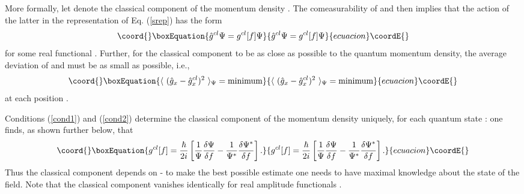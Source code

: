 \documentclass[a4paper,preprint, showpacs, aps, draft]{revtex4}
\begin{document}
{More formally, let \coordHE{} denote the classical component of the
momentum density \coordHE{}.  The comeasurability of \coordHE{} and
\coordHE{} then implies that the action of the latter in the
representation of Eq. (\ref{srep}) has the form
\begin{equation}\coord{}\boxEquation{ \label{cond1}
\hat{g}^{cl} \Psi = g^{cl}[f]\Psi
}{ \hat{g}^{cl} \Psi = g^{cl}[f]\Psi
}{ecuacion}\coordE{}\end{equation}
for some real functional \coordHE{}.   
Further, for the classical component to be as close as possible
to the quantum momentum density, the average
deviation of \coordHE{} and \coordHE{} must be as small as possible,
i.e., 
\begin{equation}\coord{}\boxEquation{ \label{cond2}
\langle ~(\hat{g}_x - \hat{g}^{cl}_x)^2~ \rangle_\Psi = {\rm
minimum}
}{ \langle ~(\hat{g}_x - \hat{g}^{cl}_x)^2~ \rangle_\Psi = {\rm
minimum}
}{ecuacion}\coordE{}\end{equation}
at each position \coordHE{}.

Conditions (\ref{cond1}) and (\ref{cond2}) determine the classical
component of the momentum density uniquely, for each quantum state
\myHighlight{$\Psi$}\coordHE{}: one finds, as shown further below, that  
\begin{equation}\coord{}\boxEquation{ \label{gcl}
g^{cl}[f] = \frac{\hbar}{2i} \left[\frac{1}{\Psi}\frac{\delta\Psi}{\delta f} 
- \frac{1}{\Psi^*}\frac{\delta\Psi^*}{\delta f} \right]. 
}{ g^{cl}[f] = \frac{\hbar}{2i} \left[\frac{1}{\Psi}\frac{\delta\Psi}{\delta f} 
- \frac{1}{\Psi^*}\frac{\delta\Psi^*}{\delta f} \right]. 
}{ecuacion}\coordE{}\end{equation}
Thus the classical component depends on
\myHighlight{$\Psi$}\coordHE{} - to make the best possible estimate one needs to have 
maximal knowledge about the state of the field. Note that the
classical component vanishes identically for real amplitude functionals
\myHighlight{$\Psi[f]$}\coordHE{}.

}
\end{document}
